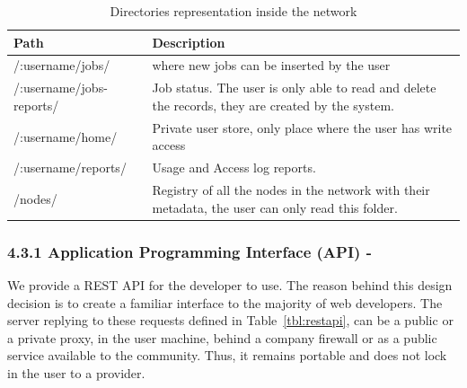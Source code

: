 \begin{table}
  \begin{tabular}{ p{3cm} | p{9cm} }
  Path & Description \\
  \hline 
  /:username/jobs/ & where new jobs can be inserted by the user \\
  \hline
  /:username/jobs-reports/ & Job status. The user is only able to read and delete the records, they are created by the system. \\
  \hline 
  /:username/home/ &  Private user store, only place where the user has write access \\
  \hline   
  /:username/reports/ & Usage and Access log reports. \\ 
  \hline   
  /nodes/ & Registry of all the nodes in the network with their metadata, the user can only read this folder. \\
  \end{tabular}
  \caption{Directories representation inside the network}
  \label{tbl:dirrepnet}
\end{table}

\subsubsection{4.3.1 Application Programming Interface (API) -}

We provide a REST API for the developer to use. The reason behind this design decision is to create a familiar interface to the majority of web developers. The server replying to these requests defined in Table~\ref{tbl:restapi}, can be a public or a private proxy, in the user machine, behind a company firewall or as a public service available to the community. Thus, it remains portable and does not lock in the user to a provider.

